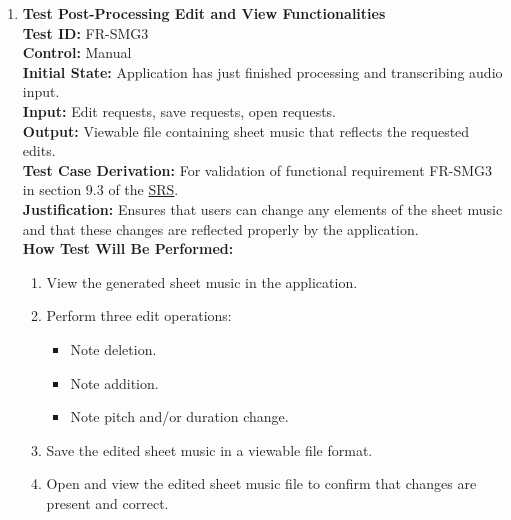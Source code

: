 \documentclass[12pt, titlepage]{article}
\begin{document}
\begin{enumerate}
  \item \textbf{Test Post-Processing Edit and View Functionalities} \\
    \newline
    \textbf{Test ID:} FR-SMG3 \\
    \textbf{Control:} Manual \\
    \textbf{Initial State:} Application has just finished processing and transcribing audio input. \\
    \textbf{Input:} Edit requests, save requests, open requests. \\
    \textbf{Output:} Viewable file containing sheet music that reflects the requested edits. \\
    \textbf{Test Case Derivation:} For validation of functional requirement FR-SMG3 in section 9.3 of the 
    \href{https://github.com/emilyperica/ScoreGen/blob/main/docs/SRS-Volere/SRS.pdf}{SRS}. \\
    \textbf{Justification:} Ensures that users can change any elements of the sheet music and that these 
    changes are reflected properly by the application.\\ 
    \textbf{How Test Will Be Performed:}
    \begin{enumerate}
        \item View the generated sheet music in the application.
        \item Perform three edit operations:
        \begin{itemize}
            \item Note deletion.
            \item Note addition.
            \item Note pitch and/or duration change.
        \end{itemize}
        \item Save the edited sheet music in a viewable file format.
        \item Open and view the edited sheet music file to confirm that changes are present and correct.
    \end{enumerate}
  \end{enumerate}
\end{document}
